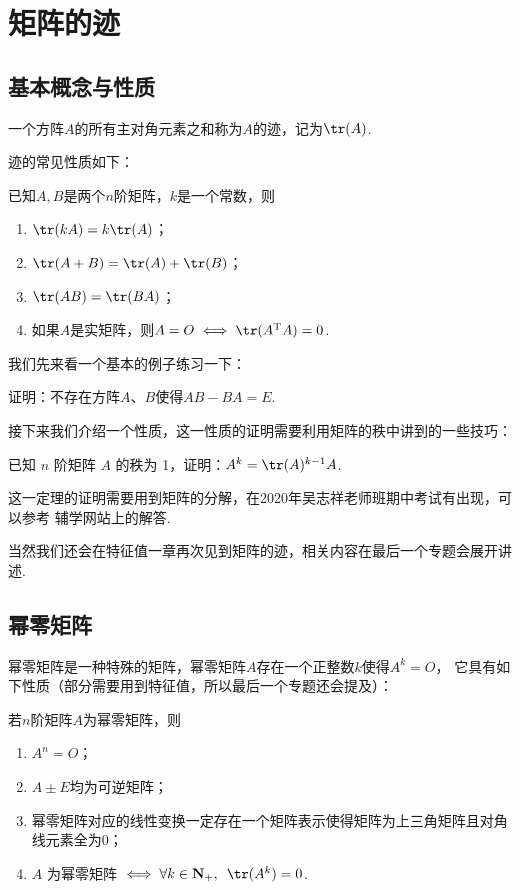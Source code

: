 \section{矩阵的迹}
\subsection{基本概念与性质}
\begin{definition}
    一个方阵$A$的所有主对角元素之和称为$A$的迹，记为$\tr(A)$.
\end{definition}
迹的常见性质如下：
\begin{theorem}
    已知$A, B$是两个$n$阶矩阵，$k$是一个常数，则
    \begin{enumerate}
        \item $\tr(kA) = k\tr(A)$；

        \item $\tr(A+B)=\tr(A)+\tr(B)$；

        \item $\tr(AB)=\tr(BA)$；

        \item 如果$A$是实矩阵，则$A=O \iff \tr(A^{\mathrm{T}}A)=0$.
    \end{enumerate}
\end{theorem}

我们先来看一个基本的例子练习一下：
\begin{example}
    证明：不存在方阵$A$、$B$使得$AB-BA=E$.
\end{example}

接下来我们介绍一个性质，这一性质的证明需要利用矩阵的秩中讲到的一些技巧：
\begin{theorem}
    已知 $n$ 阶矩阵 $A$ 的秩为 1，证明：$A^k=\tr(A)^{k-1}A$.
\end{theorem}
这一定理的证明需要用到矩阵的分解，在2020年吴志祥老师班期中考试有出现，可以参考
辅学网站上的解答.

当然我们还会在特征值一章再次见到矩阵的迹，相关内容在最后一个专题会展开讲述.

\subsection{幂零矩阵}
幂零矩阵是一种特殊的矩阵，幂零矩阵$A$存在一个正整数$k$使得$A^k=O$，
它具有如下性质（部分需要用到特征值，所以最后一个专题还会提及）：
\begin{theorem}
    若$n$阶矩阵$A$为幂零矩阵，则
    \begin{enumerate}
        \item $A^n=O$；

        \item $A\pm E$均为可逆矩阵；

        \item 幂零矩阵对应的线性变换一定存在一个矩阵表示使得矩阵为上三角矩阵且对角线元素全为0；

        \item $A$ 为幂零矩阵 $\iff \forall k \in \mathbf{N}_+,\enspace\tr(A^k)=0$.
    \end{enumerate}
\end{theorem}

